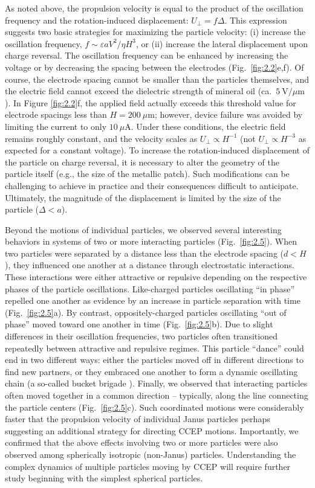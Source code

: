 As noted above, the propulsion velocity is equal to the product of the oscillation frequency and the rotation-induced displacement: $U_{\perp}=f\Delta$.
This expression suggests two basic strategies for maximizing the particle velocity: (i) increase the oscillation frequency, $f\sim\varepsilon a V^2/\eta H^3$, or (ii) increase the lateral displacement upon charge reversal.
The oscillation frequency can be enhanced by increasing the voltage or by decreasing the spacing between the electrodes (Fig.~\ref{fig:2.2}e,f).
Of course, the electrode spacing cannot be smaller than the particles themselves, and the electric field cannot exceed the dielectric strength of mineral oil (ca.~$5~\text{V/}\mu\text{m}$).
In Figure \ref{fig:2.2}f, the applied field actually exceeds this threshold value for electrode spacings less than $H=200~\mu\text{m}$; however, device failure was avoided by limiting the current to only $10~\mu\text{A}$.
Under these conditions, the electric field remains roughly constant, and the velocity scales as $U_{\perp}\propto H^{-1}$ (not $U_{\perp}\propto H^{-3}$ as expected for a constant voltage). 
To increase the rotation-induced displacement of the particle on charge reversal, it is necessary to alter the geometry of the particle itself (e.g., the size of the metallic patch). 
Such modifications can be challenging to achieve in practice and their consequences difficult to anticipate. 
Ultimately, the magnitude of the displacement is limited by the size of the particle ($\Delta < a$).

Beyond the motions of individual particles, we observed several interesting  behaviors in systems of two or more interacting particles (Fig.~\ref{fig:2.5}).
When two particles were separated by a distance less than the electrode spacing ($d<H$), they influenced one another at a distance through electrostatic interactions.
These interactions were either attractive or repulsive depending on the respective phases of the particle oscillations\cite{mersch2011antiphase}.
Like-charged particles oscillating ``in phase'' repelled one another as evidence by an increase in particle separation with time (Fig.~\ref{fig:2.5}a).
By contrast, oppositely-charged particles oscillating ``out of phase'' moved toward one another in time (Fig.~\ref{fig:2.5}b).
Due to slight differences in their oscillation frequencies, two particles often transitioned repeatedly between attractive and repulsive regimes.
This particle ``dance'' could end in two different ways: either the particles moved off in different directions to find new partners, or they embraced one another to form a dynamic oscillating chain (a so-called bucket brigade \cite{Pelesko2004a}).
Finally, we observed that interacting particles often moved together in a common direction -- typically, along the line connecting the particle centers (Fig.~\ref{fig:2.5}c).
Such coordinated motions were considerably faster that the propulsion velocity of individual Janus particles perhaps suggesting an additional strategy for directing CCEP motions.
Importantly, we confirmed that the above effects involving two or more particles were also observed among spherically isotropic (non-Janus) particles.
Understanding the complex dynamics of multiple particles moving by CCEP will require further study beginning with the simplest spherical particles.

